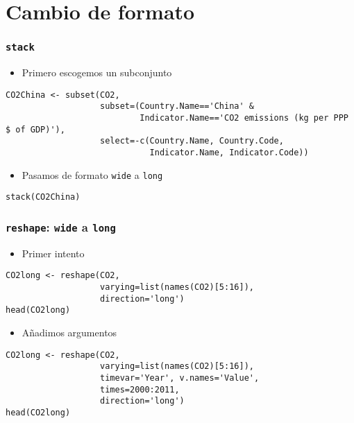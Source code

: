 \documentclass[xcolor={usenames,svgnames,dvipsnames}]{beamer}
\begin{document}
\section{Cambio de formato}
\label{sec-4}
\begin{frame}[fragile]
\frametitle{\texttt{stack}}
\label{sec-4-1}

\begin{itemize}
\item Primero escogemos un subconjunto
\end{itemize}

\lstset{language=R}
\begin{lstlisting}
CO2China <- subset(CO2,
                   subset=(Country.Name=='China' &
                           Indicator.Name=='CO2 emissions (kg per PPP $ of GDP)'),
                   select=-c(Country.Name, Country.Code,
                             Indicator.Name, Indicator.Code))
\end{lstlisting}
\begin{itemize}
\item Pasamos de formato \texttt{wide} a \texttt{long}
\end{itemize}

\lstset{language=R}
\begin{lstlisting}
stack(CO2China)
\end{lstlisting}
\end{frame}
\begin{frame}[fragile]
\frametitle{\texttt{reshape}: \texttt{wide} a \texttt{long}}
\label{sec-4-2}

\begin{itemize}
\item Primer intento
\end{itemize}

\lstset{language=R}
\begin{lstlisting}
CO2long <- reshape(CO2,
                   varying=list(names(CO2)[5:16]),
                   direction='long')
head(CO2long)
\end{lstlisting}
\begin{itemize}
\item Añadimos argumentos
\end{itemize}

\lstset{language=R}
\begin{lstlisting}
CO2long <- reshape(CO2,
                   varying=list(names(CO2)[5:16]),
                   timevar='Year', v.names='Value',
                   times=2000:2011,
                   direction='long')
head(CO2long)
\end{lstlisting}
\end{frame}
\end{document}
